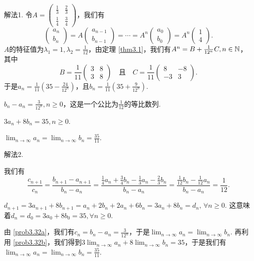 \begin{solution}
  {\kaishu 解法1.} 令$A=\begin{pmatrix}
    \frac13 & \frac23 \\
    \frac14 & \frac34
  \end{pmatrix}$，我们有
  \[
    \begin{pmatrix}
      a_n \\ b_n
    \end{pmatrix} = A \begin{pmatrix}
      a_{n-1} \\ b_{n-1}
    \end{pmatrix} = \cdots =
    A^n \begin{pmatrix}
      a_0 \\ b_0
    \end{pmatrix} = A^n \begin{pmatrix}
      1 \\ 4
    \end{pmatrix}.
  \]
  $A$的特征值为$\lambda_1=1,\lambda_2=\frac1{12}$，由定理 \ref{thm3.1}，我们有$A^n=B+\frac1{12^n}C,n\in\mathbb N$，其中
  \[
    B = \frac1{11}\begin{pmatrix}
      3 & 8 \\
      3 & 8
    \end{pmatrix} \quad \text{且} \quad
    C = \frac1{11} \begin{pmatrix}
      8 & -8 \\
      -3 & 3
    \end{pmatrix}.
  \]
  于是$a_n=\frac1{11}\left(35-\frac{24}{12^n}\right)$，且$b_n=\frac1{11}\left(
  35+\frac9{12^n}\right)$.
  \begin{enum}
    \item $b_n-a_n=\frac3{12^n},n\ge0$，这是一个公比为$\frac1{12}$的等比数列.
    \item $3a_n+8b_n=35,n\ge0$.
    \item $\lim_{n\to\infty}a_n=\lim_{n\to\infty}b_n
        =\frac{35}{11}$.
  \end{enum}

  {\kaishu 解法2.} \begin{inparaenum}[(a)]
    \item 我们有
    \[
      \frac{c_{n+1}}{c_n} = \frac{b_{n+1}-a_{n+1}}
      {b_n-a_n} = \frac{\frac14a_n+\frac34b_n-\frac13a_n-\frac23b_n}
      {b_n-a_n} = \frac{\frac1{12}b_n-\frac1{12}a_n}{b_n-a_n}
      = \frac1{12}.
    \]

    \item $d_{n+1}=3a_{n+1}+8b_{n+1}=a_n+2b_n+2a_n+6b_n
        =3a_n+8b_n=d_n,\,\forall n\ge0$. 这意味着$d_n=d_0=3a_0+8b_0=35,\forall n\ge0$.

    \item 由 \ref{prob3.32a}，我们有$c_n=b_n-a_n=\frac3{12^n}$，于是$\lim_{n\to\infty}a_n=\lim_{n\to\infty}b_n$. 再利用 \ref{prob3.32b}，我们得到$3\lim_{n\to\infty}a_n+8\lim_{n\to\infty}b_n=35$，于是我们有$\lim_{n\to\infty}a_n=\lim_{n\to\infty}b_n
        =\frac{35}{11}$.
  \end{inparaenum}
\end{solution}

